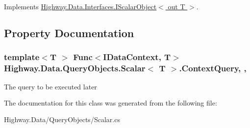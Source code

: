 Implements \hyperlink{interface_highway_1_1_data_1_1_interfaces_1_1_i_scalar_object-g_afe687ef242a0e465c47e7feb104b0ce5}{Highway.\-Data.\-Interfaces.\-I\-Scalar\-Object$<$ out T $>$}.



\subsection{Property Documentation}
\hypertarget{class_highway_1_1_data_1_1_query_objects_1_1_scalar-g_acb183b773f6c4bb8c9a989c1144095db}{
\subsubsection[{Context\-Query}]{\setlength{\rightskip}{0pt plus 5cm}template$<$T $>$ Func$<${\bf I\-Data\-Context}, T$>$ {\bf Highway.\-Data.\-Query\-Objects.\-Scalar}$<$ T $>$.Context\-Query\hspace{0.3cm}{\ttfamily [get]}, {\ttfamily [set]}, {\ttfamily [protected]}}}\label{class_highway_1_1_data_1_1_query_objects_1_1_scalar-g_acb183b773f6c4bb8c9a989c1144095db}


The query to be executed later 



The documentation for this class was generated from the following file\-:\begin{DoxyCompactItemize}
\item 
Highway.\-Data/\-Query\-Objects/Scalar.\-cs\end{DoxyCompactItemize}
